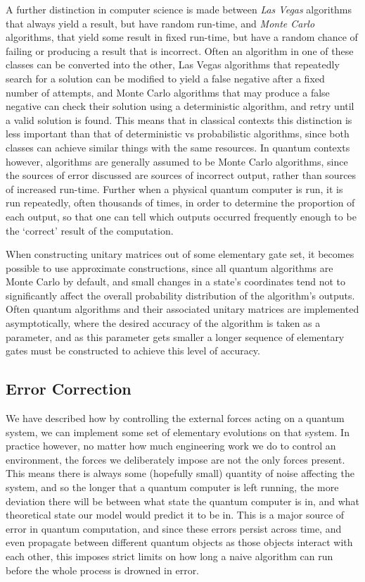 A further distinction in computer science is made between \emph{Las Vegas} algorithms that always yield a result, but have random run-time, and \emph{Monte Carlo} algorithms, that yield some result in fixed run-time, but have a random chance of failing or producing a result that is incorrect. Often an algorithm in one of these classes can be converted into the other, Las Vegas algorithms that repeatedly search for a solution can be modified to yield a false negative after a fixed number of attempts, and Monte Carlo algorithms that may produce a false negative can check their solution using a deterministic algorithm, and retry until a valid solution is found. This means that in classical contexts this distinction is less important than that of deterministic vs probabilistic algorithms, since both classes can achieve similar things with the same resources. In quantum contexts however, algorithms are generally assumed to be Monte Carlo algorithms, since the sources of error discussed are sources of incorrect output, rather than sources of increased run-time. Further when a physical quantum computer is run, it is run repeatedly, often thousands of times, in order to determine the proportion of each output, so that one can tell which outputs occurred frequently enough to be the `correct' result of the computation.

When constructing unitary matrices out of some elementary gate set, it becomes possible to use approximate constructions, since all quantum algorithms are Monte Carlo by default, and small changes in a state's coordinates tend not to significantly affect the overall probability distribution of the algorithm's outputs. Often quantum algorithms and their associated unitary matrices are implemented asymptotically, where the desired accuracy of the algorithm is taken as a parameter, and as this parameter gets smaller a longer sequence of elementary gates must be constructed to achieve this level of accuracy.

\subsection{Error Correction}\label{error-codes}
We have described how by controlling the external forces acting on a quantum system, we can implement some set of elementary evolutions on that system. In practice however, no matter how much engineering work we do to control an environment, the forces we deliberately impose are not the only forces present. This means there is always some (hopefully small) quantity of noise affecting the system, and so the longer that a quantum computer is left running, the more deviation there will be between what state the quantum computer is in, and what theoretical state our model would predict it to be in. This is a major source of error in quantum computation, and since these errors persist across time, and even propagate between different quantum objects as those objects interact with each other, this imposes strict limits on how long a naive algorithm can run before the whole process is drowned in error.


